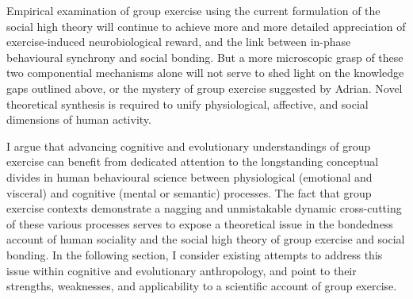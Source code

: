 \begin{CJK}{UTF8}{gbsn}
Empirical examination of group exercise using the current formulation of the social high theory will continue to achieve more and more detailed appreciation of exercise-induced neurobiological reward, and the link between in-phase behavioural synchrony and social bonding. But a more microscopic grasp of these two componential mechanisms alone will not serve to shed light on the knowledge gaps outlined above, or the mystery of group exercise suggested by Adrian.  Novel theoretical synthesis is required to unify physiological, affective, and social dimensions of human activity.

I argue that advancing cognitive and evolutionary understandings of group exercise can benefit from dedicated attention to the longstanding conceptual divides in human behavioural science between physiological (emotional and visceral) and cognitive (mental or semantic) processes.   The fact that group exercise contexts demonstrate a nagging and unmistakable dynamic cross-cutting of these various processes serves to expose a theoretical issue in the bondedness account of human sociality and the social high theory of group exercise and social bonding.  In the following section, I consider existing attempts to address this issue within cognitive and evolutionary anthropology, and point to their strengths, weaknesses, and applicability to a scientific account of group exercise.








\end{CJK}
